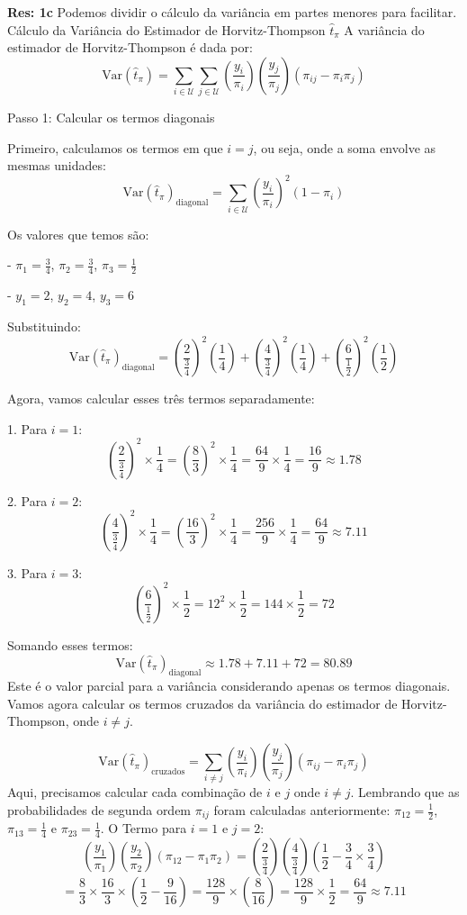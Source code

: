 \documentclass[a4paper,12pt,oneside,twocolumn]{Config/milktest}
\begin{document}
\medskip
{\scriptsize

\textbf{Res:  1c} Podemos dividir o cálculo da variância em partes menores para facilitar. Cálculo da Variância do Estimador de Horvitz-Thompson \(\hat{t}_\pi\) A variância do estimador de Horvitz-Thompson é dada por:
\[
\text{Var}(\hat{t}_\pi) = \sum_{i \in \mathcal{U}} \sum_{j \in \mathcal{U}} \left(\frac{y_i}{\pi_i}\right) \left(\frac{y_j}{\pi_j}\right) (\pi_{ij} - \pi_i \pi_j)
\]

Passo 1: Calcular os termos diagonais

Primeiro, calculamos os termos em que \(i = j\), ou seja, onde a soma envolve as mesmas unidades:
\[
\text{Var}(\hat{t}_\pi)_{\text{diagonal}} = \sum_{i \in \mathcal{U}} \left(\frac{y_i}{\pi_i}\right)^2 (1 - \pi_i)
\]

Os valores que temos são:

- \(\pi_1 = \frac{3}{4}\), \(\pi_2 = \frac{3}{4}\), \(\pi_3 = \frac{1}{2}\)

- \(y_1 = 2\), \(y_2 = 4\), \(y_3 = 6\)

Substituindo:
\[
\text{Var}(\hat{t}_\pi)_{\text{diagonal}} = \left(\frac{2}{\frac{3}{4}}\right)^2 \left(\frac{1}{4}\right) + \left(\frac{4}{\frac{3}{4}}\right)^2 \left(\frac{1}{4}\right) + \left(\frac{6}{\frac{1}{2}}\right)^2 \left(\frac{1}{2}\right)
\]

Agora, vamos calcular esses três termos separadamente:

1. Para \(i = 1\):
\[
\left(\frac{2}{\frac{3}{4}}\right)^2 \times \frac{1}{4} = \left(\frac{8}{3}\right)^2 \times \frac{1}{4} = \frac{64}{9} \times \frac{1}{4} = \frac{16}{9} \approx 1.78
\]

2. Para \(i = 2\):
\[
\left(\frac{4}{\frac{3}{4}}\right)^2 \times \frac{1}{4} = \left(\frac{16}{3}\right)^2 \times \frac{1}{4} = \frac{256}{9} \times \frac{1}{4} = \frac{64}{9} \approx 7.11
\]

3. Para \(i = 3\):
\[
\left(\frac{6}{\frac{1}{2}}\right)^2 \times \frac{1}{2} = 12^2 \times \frac{1}{2} = 144 \times \frac{1}{2} = 72
\]

Somando esses termos:
\[
\text{Var}(\hat{t}_\pi)_{\text{diagonal}} \approx 1.78 + 7.11 + 72 = 80.89
\]
Este é o valor parcial para a variância considerando apenas os termos diagonais. Vamos agora calcular os termos cruzados da variância do estimador de Horvitz-Thompson, onde \(i \neq j\).

\[
\text{Var}(\hat{t}_\pi)_{\text{cruzados}} = \sum_{i \neq j} \left(\frac{y_i}{\pi_i}\right) \left(\frac{y_j}{\pi_j}\right) (\pi_{ij} - \pi_i \pi_j)
\]
Aqui, precisamos calcular cada combinação de \(i\) e \(j\) onde \(i \neq j\). Lembrando que as probabilidades de segunda ordem \(\pi_{ij}\) foram calculadas anteriormente: \(\pi_{12} = \frac{1}{2}\), \(\pi_{13} = \frac{1}{4}\) e \(\pi_{23} = \frac{1}{4}\). O Termo para \(i = 1\) e \(j = 2\):
\[
\left(\frac{y_1}{\pi_1}\right) \left(\frac{y_2}{\pi_2}\right) (\pi_{12} - \pi_1 \pi_2) = \left(\frac{2}{\frac{3}{4}}\right) \left(\frac{4}{\frac{3}{4}}\right) \left(\frac{1}{2} - \frac{3}{4} \times \frac{3}{4}\right)
\]
\[
= \frac{8}{3} \times \frac{16}{3} \times \left(\frac{1}{2} - \frac{9}{16}\right) = \frac{128}{9} \times \left(\frac{8}{16}\right) = \frac{128}{9} \times \frac{1}{2} = \frac{64}{9} \approx 7.11
\]

}
\end{document}
